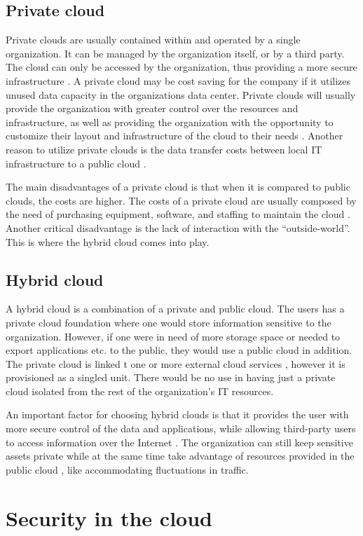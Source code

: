 \subsection{Private cloud}
Private clouds are usually contained within and operated by a single organization. It can be managed by the organization itself, or by a third party. The cloud can only be accessed by the organization, thus providing a more secure infrastructure \cite{GoyalSumit}. A private cloud may be cost saving for the company if it utilizes unused data capacity in the organizations data center. Private clouds will usually provide the organization with greater control over the resources and infrastructure, as well as providing the organization with the opportunity to customize their layout and infrastructure of the cloud to their needs \cite{IBM}. 
Another reason to utilize private clouds is the data transfer costs between local IT infrastructure to a public cloud \cite{DillonWuChang}.

The main disadvantages of a private cloud is that when it is compared to public clouds, the costs are higher. The costs of a private cloud are usually composed by the need of purchasing equipment, software, and staffing to maintain the cloud \cite{GoyalSumit}. Another critical disadvantage is the lack of interaction with the \enquote{outside-world}. This is where the hybrid cloud comes into play.

\subsection{Hybrid cloud}
A hybrid cloud is a combination of a private and public cloud. The users has a private cloud foundation \cite{IBM} where one would store information sensitive to the organization. However, if one were in need of more storage space or needed to export applications etc. to the public, they would use a public cloud in addition. The private cloud is linked t one or more external cloud services \cite{Ramgovind}, however it is provisioned as a singled unit. There would be no use in having just a private cloud isolated from the rest of the organization's IT resources. 

An important factor for choosing hybrid clouds is that it provides the user with more secure control of the data and applications, while allowing third-party users to access information over the Internet \cite{Ramgovind}. The organization can still keep sensitive assets private while at the same time take advantage of resources provided in the public cloud \cite{Azure}, like accommodating fluctuations in traffic.

\section{Security in the cloud}

